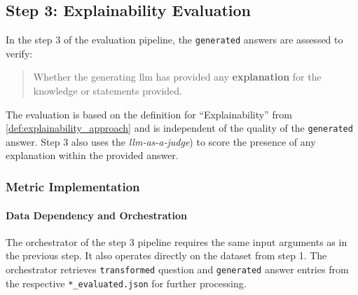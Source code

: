 \subsection{Step 3: Explainability Evaluation}\label{sub:Step3_eval}

In the step 3 of the evaluation pipeline, the \texttt{generated} answers are assessed to verify:\\
%
\begin{quote}
Whether the generating \ac{llm} has provided any \textbf{explanation} for the knowledge or statements provided.
\end{quote}
%
The evaluation is based on the definition for \enquote{Explainability} from \cref{def:explainability_approach} and is independent of the quality of the \texttt{generated} answer. 
Step 3 also uses the \textit{llm-as-a-judge}) to score the presence of any explanation within the provided answer.
%
\subsubsection{Metric Implementation}

\paragraph{Data Dependency and Orchestration}\label{par:data_orchestrate_Step3}
The orchestrator of the step 3 pipeline requires the same input arguments as in the previous step.
It also operates directly on the dataset from step 1.
The orchestrator retrieves \texttt{transformed} question and \texttt{generated} answer entries from the respective \texttt{*\_evaluated.json} for further processing.

